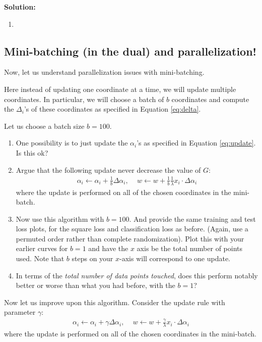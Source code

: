 \documentclass{article}
\newcommand{\solution}{\textbf{\vskip 0.2cm \large Solution:\\}}
\begin{document}
\solution

\begin{enumerate}
	\item 
\end{enumerate}


\subsection{Mini-batching (in the dual) and parallelization!}
Now, let us understand parallelization issues with mini-batching. 

Here instead of updating one coordinate at a time, we will update multiple coordinates. In particular, we will choose a batch of  $b$ coordinates and compute the $\Delta_i$'s of these coordinates as specified in Equation \eqref{eq:delta}.
 
Let us choose a batch size $b=100$.

\begin{enumerate}
	\item One possibility is to just update the $\alpha_i$'s as specified in Equation \eqref{eq:update}. Is this ok?
	\item Argue that the following update never decrease the value of $G$:
	\begin{align}
		\alpha_i \leftarrow \alpha_i+\frac{1}{b}\Delta\alpha_i, \, \quad w \leftarrow
		w+\frac{1}{b}\frac{1}{\lambda}x_i \cdot \Delta\alpha_i
	\end{align}
	where the update is performed on all of the chosen coordinates in the mini-batch.
	\item  Now use this algorithm with $b=100$. And provide the same training and test loss plots, for the square loss and classification loss as before. (Again, use a permuted order rather than complete randomization). Plot this with your earlier curves for $b=1$ and have the $x$ axis be the total number of points used. Note that $b$ steps on your $x$-axis will correspond to one update.
	\item In terms of the \emph{total number of data points touched}, does this perform notably better or worse than what you had before, with the $b=1$?
\end{enumerate}

Now let us improve upon this algorithm. Consider the update rule with parameter $\gamma$:
\begin{align}
	\alpha_i \leftarrow \alpha_i+\gamma\Delta\alpha_i, \, \quad w \leftarrow
	w+\frac{\gamma}{\lambda}x_i \cdot \Delta\alpha_i
\end{align}
where the update is performed on all of the chosen coordinates in the mini-batch.
\end{document}
